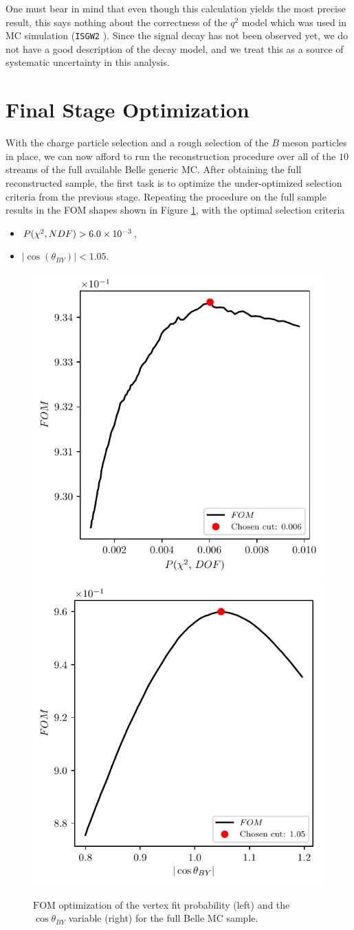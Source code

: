 One must bear in mind that even though this calculation yields the most precise result, this says nothing about the correctness of the $q^2$ model which was used in MC simulation (\texttt{ISGW2} \cite{Scora:1995ty}). Since the signal decay has not been observed yet, we do not have a good description of the decay model, and we treat this as a source of systematic uncertainty in this analysis.

\section{Final Stage Optimization}

With the charge particle selection and a rough selection of the $B$ meson particles in place, we can now afford to run the reconstruction procedure over all of the $10$ streams of the full available Belle generic MC. After obtaining the full reconstructed sample, the first task is to optimize the under-optimized selection criteria from the previous stage. Repeating the procedure on the full sample results in the FOM shapes shown in Figure \ref{fig:preciseFOM}, with the optimal selection criteria

\begin{itemize}
	\item $P(\chi^2,NDF) > 6.0\times 10^{-3}$,
	\item $\vert \cos \left(\theta_{BY}\right) \vert < 1.05$.
\end{itemize}

\begin{figure}[H]
	\centering
	\captionsetup{width=0.8\linewidth}
	\includegraphics[width=0.48\linewidth]{fig/VTX_precise}
	\includegraphics[width=0.48\linewidth]{fig/cosBY_precise}
	\caption{$\mathrm{FOM}$ optimization of the vertex fit probability (left) and the $\cos \theta_{BY}$ variable (right) for the full Belle MC sample.}
	\label{fig:preciseFOM}
\end{figure}

